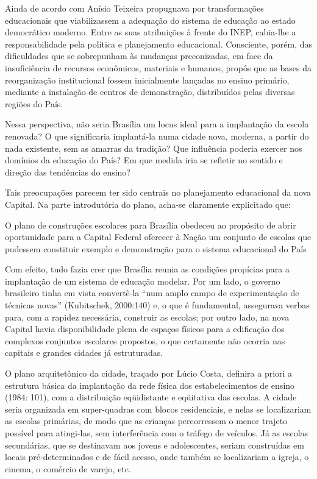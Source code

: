Ainda de acordo com  Anísio Teixeira propugnava por transformações educacionais que viabilizassem
a adequação do sistema de educação ao estado democrático moderno. Entre as suas
atribuições à frente do INEP, cabia-lhe a responsabilidade pela política e planejamento
educacional. Consciente, porém, das dificuldades que se sobrepunham às mudanças
preconizadas, em face da insuficiência de recursos econômicos, materiais e humanos,
propôs que as bases da reorganização institucional fossem inicialmente lançadas no
ensino primário, mediante a instalação de centros de demonstração, distribuídos pelas
diversas regiões do País.

Nessa perspectiva, não seria Brasília um locus ideal para a implantação da escola
renovada? O que significaria implantá-la numa cidade nova, moderna, a partir do nada
existente, sem as amarras da tradição? Que influência poderia exercer nos domínios da educação do País? Em que medida iria se refletir no sentido e direção das tendências do
ensino?

    Tais preocupações parecem ter sido centrais no planejamento educacional da
nova Capital. Na parte introdutória do plano, acha-se claramente explicitado que:

\begin{citacao}
    O plano de construções escolares para Brasília obedeceu ao propósito de
    abrir oportunidade para a Capital Federal oferecer à Nação um conjunto de
    escolas que pudessem constituir exemplo e demonstração para o sistema
    educacional do País
\end{citacao}


Com efeito, tudo fazia crer que Brasília reunia as condições propícias para a
implantação de um sistema de educação modelar. Por um lado, o governo brasileiro
tinha em vista convertê-la “num amplo campo de experimentação de técnicas novas”
(Kubitschek, 2000:140) e, o que é fundamental, assegurava verbas para, com a rapidez
necessária, construir as escolas; por outro lado, na nova Capital havia disponibilidade
plena de espaços físicos para a edificação dos complexos conjuntos escolares propostos,
o que certamente não ocorria nas capitais e grandes cidades já estruturadas.

O plano arquitetônico da cidade, traçado por Lúcio Costa, definira a priori a
estrutura básica da implantação da rede física dos estabelecimentos de ensino (1984:
101), com a distribuição eqüidistante e eqüitativa das escolas. A cidade seria organizada
em super-quadras com blocos residenciais, e nelas se localizariam as escolas primárias,
de modo que as crianças percorressem o menor trajeto possível para atingi-las, sem
interferência com o tráfego de veículos. Já as escolas secundárias, que se destinavam
aos jovens e adolescentes, seriam construídas em locais pré-determinados e de fácil
acesso, onde também se localizariam a igreja, o cinema, o comércio de varejo, etc.

